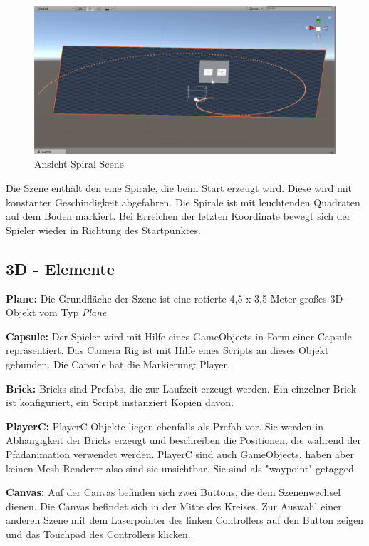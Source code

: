 \begin{figure}[h!]
	\includegraphics[scale=0.5]{bilder/spiralScene.png}
	\caption{Ansicht Spiral Scene}
\end{figure}


Die Szene enthält den eine Spirale, die beim Start erzeugt wird. Diese wird mit konstanter Geschindigkeit abgefahren. Die Spirale ist mit leuchtenden Quadraten auf dem Boden markiert. Bei Erreichen der letzten Koordinate bewegt sich der Spieler wieder in Richtung des Startpunktes. 

\subsection{3D - Elemente}

\textbf{Plane: } Die Grundfläche der Szene ist eine rotierte 4,5 x 3,5 Meter großes 3D-Objekt vom Typ \emph{Plane}.

\textbf{Capsule: } Der Spieler wird mit Hilfe eines GameObjects in Form einer Capsule repräsentiert. Das Camera Rig ist mit Hilfe eines Scripts an dieses Objekt gebunden. Die Capsule hat die Markierung: Player.

\textbf{Brick: } Bricks sind Prefabs, die zur Laufzeit erzeugt werden. Ein einzelner Brick ist konfiguriert, ein Script instanziert Kopien davon.

\textbf{PlayerC: } PlayerC Objekte liegen ebenfalls als Prefab vor. Sie werden in Abhängigkeit der Bricks erzeugt und beschreiben die Positionen, die während der Pfadanimation verwendet werden. PlayerC sind auch GameObjects, haben aber keinen Mesh-Renderer also sind sie unsichtbar. Sie sind als "waypoint" getagged.

\textbf{Canvas: } Auf der Canvas befinden sich zwei Buttons, die dem Szenenwechsel dienen. Die Canvas befindet sich in der Mitte des Kreises. Zur Auswahl einer anderen Szene mit dem Laserpointer des linken Controllers auf den Button zeigen und das Touchpad des Controllers klicken. 


